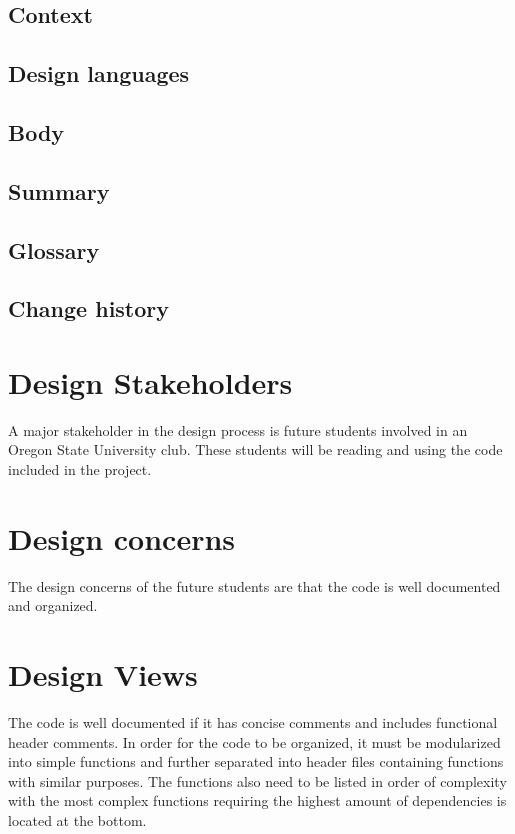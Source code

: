 \documentclass[10pt,letterpaper,onecolumn,draftclsnofoot]{IEEEtran}
\begin{document}
\subsection{Context}

\subsection{Design languages}

\subsection{Body}

\subsection{Summary}

\subsection{Glossary}

\subsection{Change history}


\section{Design Stakeholders}
	A major stakeholder in the design process is future students involved in an Oregon State University club. These students will be reading and using the code included in the project.
	
\section{Design concerns}
	The design concerns of the future students are that the code is well documented and organized. 
	
\section{Design Views}
	The code is well documented if it has concise comments and includes functional header comments. In order for the code to be organized, it must be modularized into simple functions and further separated into header files containing functions with similar purposes. The functions also need to be listed in order of complexity with the most complex functions requiring the highest amount of dependencies is located at the bottom.
	
\end{document}
